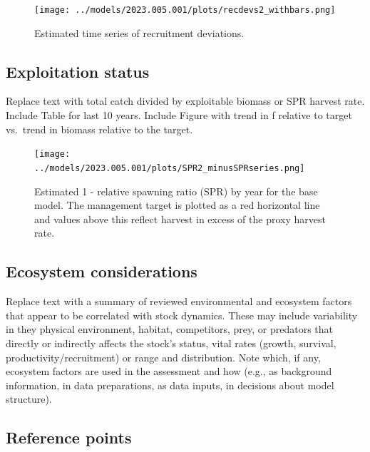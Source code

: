 \documentclass[11pt,
  english,
  letterpaper,
]{article}
\begin{document}
\begin{figure}
\centering
\texttt{[image: ../models/2023.005.001/plots/recdevs2\_withbars.png]}
\caption{Estimated time series of recruitment deviations.\label{fig:es-rec-devs}}
\end{figure}

\clearpage

\hypertarget{exploitation-status}{%
\subsection*{Exploitation status}\label{exploitation-status}}

Replace text with total catch divided by exploitable biomass or SPR harvest rate. Include Table for last 10 years. Include Figure with trend in f relative to target vs.~trend in biomass relative to the target.



\begin{figure}
\centering
\texttt{[image: ../models/2023.005.001/plots/SPR2\_minusSPRseries.png]}
\caption{Estimated 1 - relative spawning ratio (SPR) by year for the base model. The management target is plotted as a red horizontal line and values above this reflect harvest in excess of the proxy harvest rate.\label{fig:es-1-spr}}
\end{figure}

\clearpage

\hypertarget{ecosystem-considerations}{%
\subsection*{Ecosystem considerations}\label{ecosystem-considerations}}

Replace text with a summary of reviewed environmental and ecosystem factors that appear to be correlated with stock dynamics. These may include variability in they physical environment, habitat, competitors, prey, or predators that directly or indirectly affects the stock's status, vital rates (growth, survival, productivity/recruitment) or range and distribution. Note which, if any, ecosystem factors are used in the assessment and how (e.g., as background information, in data preparations, as data inputs, in decisions about model structure).

\hypertarget{reference-points}{%
\subsection*{Reference points}\label{reference-points}}
\end{document}
